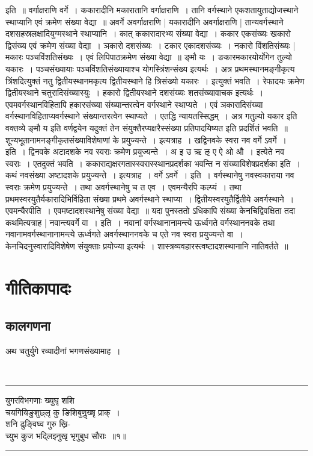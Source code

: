\documentclass[12pt,a4paper]{report}
\newenvironment{moola}
{
~\\
\hrule
\begin{center}
\begin{LARGE}
}
{
\end{LARGE}
\end{center}
\hrule
~\\
}
\begin{document}
इति~॥ वर्गाक्षराणि वर्गे~। ककारादीनि मकारातानि वर्गाक्षराणि~। तानि वर्गस्थाने एकशतायुताद्योजस्थाने स्थाप्यानि एवं क्रमेण संख्या वेद्या~॥ अवर्गे
अवर्गाक्षराणि | यकारादीनि अवर्गाक्षराणि | तान्यवर्गस्थाने दशसहस्रलक्षादियुग्मस्थाने स्थाप्यानि~। कात् ककारादारभ्य संख्या वेद्या~। ककार एकसंख्यः
खकारो द्विसंख्य एवं क्रमेण संख्या वेद्या~। ञकारो दशसंख्यः~। टकार एकादशसंख्यः~। नकारो विंशतिसंख्यः | मकारः पञ्चविंशतिसंख्यः~। एवं लिपिपाठक्रमेण संख्या वेद्या~॥ ङ्मौ यः~। ङकारमकारयोर्योगेन तुल्यो यकारः~। पञ्चसंख्यायाः पञ्चविंशतिसंख्यायाश्च योगस्त्रिंशन्संख्य इत्यर्थः~। अत्र प्रथमस्थानमङ्गीकृत्य त्रिंशदित्युक्तं नतु द्वितीयस्थानमकृत्य द्वितीयस्थाने हि त्रिसंख्यो यकारः~। इत्युक्तं भवति~। रेफादयः क्रमेण द्वितीयस्थाने चतुरादिसंख्यास्युः~। हकारो द्वितीयस्थाने दशसंख्यः शतसंख्यावाचक इत्यर्थः~। एवमवर्गस्थानविहितापि हकारसंख्या संख्यान्तरत्वेन वर्गस्थाने स्थाप्यते~। एवं ञकारादिसंख्या वर्गस्थानविहिताप्यवर्गस्थाने संख्यान्तरत्वेन स्थाप्यते~। एतद्धि न्यायतस्सिद्धम्~। अत्र गतुल्यो यकार इति वक्तव्ये ङ्मौ य इति वर्णद्वयेन यदुक्तं तेन संयुक्तैरप्यक्षरैस्संख्या प्रतिपादयिष्यत इति प्रदर्शितं भवति~॥ शून्यभूतानामनङ्गीकृतसंख्याविशेषाणां के प्रयुज्यन्ते~। इत्यत्राह~। खद्विनवके स्वरा नव वर्गे ऽवर्गे~। इति~। द्विनवके अटादशके नव स्वराः क्रमेण प्रयुज्यन्ते~। अ इ उ ऋ ऌ ए ऐ ओ औ~। इत्येते नव स्वराः~। एतदुक्तं भवति~। ककाराद्यक्षरगतास्स्वरास्स्थानप्रदर्शका भवन्ति न संख्याविशेषप्रदर्शका इति~। कथं नवसंख्या अष्टादशके प्रयुज्यन्ते~। इत्यत्राह~। वर्गे ऽवर्गे~। इति~। वर्गस्थानेषु नवस्वकाराया नव स्वराः क्रमेण प्रयुज्यन्ते~। तथा अवर्गस्थानेषु च त एव~। एवमन्यैरपि कल्प्यं~। तथा प्रथमस्वरयुतैर्यकारादिभिर्विहिता संख्या प्रथमे अवर्गस्थाने स्थाप्या~। द्वितीयस्वरयुतैर्द्वितीये अवर्गस्थाने~। एवमन्यैरपीति~। एवमष्टादशस्थानेषु संख्या वेद्या~॥ यदा पुनस्ततो ऽधिकापि संख्या केनचिद्विवक्षिता तदा कथमित्यत्राह | नवान्त्यवर्गे वा~। इति~। नवानां वर्गस्थानानामन्त्ये ऊर्ध्वगते वर्गस्थाननवके तथा नवानामवर्गस्थानानामन्त्ये ऊर्ध्वगते अवर्गस्थाननवके च एते नव स्वरा प्रयुज्यन्ते वा~। केनचिदनुस्वारादिविशेषेण संयुक्ताः प्रयोज्या इत्यर्थः~। शास्त्रव्यवहारस्त्वष्टादशस्थानानि नातिवर्तते~॥

\chapter{गीतिकापादः}

\section{कालगणना}

अथ चतुर्युगे रव्यादीनां भगणसंख्यामाह~।

\begin{moola}
युगरविभगणाः ख्युघृ शशि \\
चयगियिङुशुछ्लृ कु ङिशिबुणॢख्षृ प्राक्~।\\
शनि ढुङ्विघ्व गुरु ख्रि- \\
च्युभ कुज भद्लिझ्नुखृ भृगुबुध सौराः~॥१॥
 \end{moola}
\end{document}
